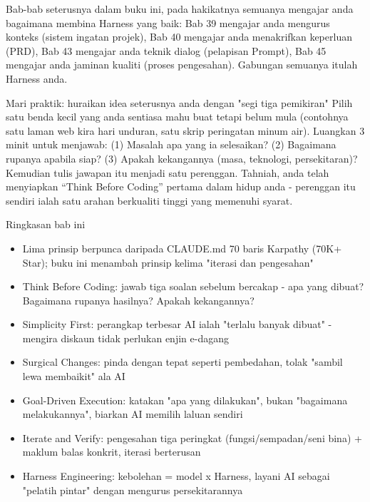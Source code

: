 Bab-bab seterusnya dalam buku ini, pada hakikatnya semuanya mengajar anda bagaimana membina Harness yang baik: Bab 39 mengajar anda mengurus konteks (sistem ingatan projek), Bab 40 mengajar anda menakrifkan keperluan (PRD), Bab 43 mengajar anda teknik dialog (pelapisan Prompt), Bab 45 mengajar anda jaminan kualiti (proses pengesahan). Gabungan semuanya itulah Harness anda.

\begin{tcbpractice}{Mari praktik: huraikan idea seterusnya anda dengan "segi tiga pemikiran"}
Pilih satu benda kecil yang anda sentiasa mahu buat tetapi belum mula (contohnya satu laman web kira hari unduran, satu skrip peringatan minum air). Luangkan 3 minit untuk menjawab: (1) Masalah apa yang ia selesaikan? (2) Bagaimana rupanya apabila siap? (3) Apakah kekangannya (masa, teknologi, persekitaran)? Kemudian tulis jawapan itu menjadi satu perenggan. Tahniah, anda telah menyiapkan “Think Before Coding” pertama dalam hidup anda - perenggan itu sendiri ialah satu arahan berkualiti tinggi yang memenuhi syarat.

\end{tcbpractice}

\begin{tcbsummary}{Ringkasan bab ini}
\begin{itemize}
  \item Lima prinsip berpunca daripada CLAUDE.md 70 baris Karpathy (70K+ Star); buku ini menambah prinsip kelima "iterasi dan pengesahan"
  \item Think Before Coding: jawab tiga soalan sebelum bercakap - apa yang dibuat? Bagaimana rupanya hasilnya? Apakah kekangannya?
  \item Simplicity First: perangkap terbesar AI ialah "terlalu banyak dibuat" - mengira diskaun tidak perlukan enjin e-dagang
  \item Surgical Changes: pinda dengan tepat seperti pembedahan, tolak "sambil lewa membaikit" ala AI
  \item Goal-Driven Execution: katakan "apa yang dilakukan", bukan "bagaimana melakukannya", biarkan AI memilih laluan sendiri
  \item Iterate and Verify: pengesahan tiga peringkat (fungsi/sempadan/seni bina) + maklum balas konkrit, iterasi berterusan
  \item Harness Engineering: kebolehan = model x Harness, layani AI sebagai "pelatih pintar" dengan mengurus persekitarannya
\end{itemize}

\end{tcbsummary}
